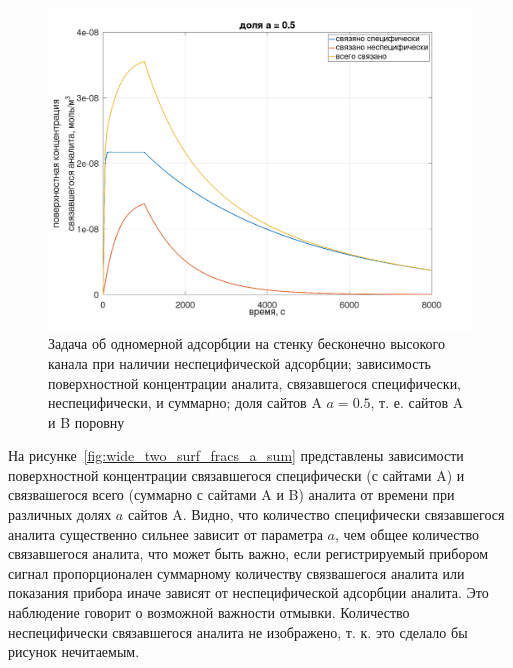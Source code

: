 \documentclass[oneside,final,12pt]{extreport}
\begin{document}
\begin{figure}
  \centering
  \includegraphics[width=.7\textwidth]{pic/flat_wide_twosurf_example}

  \caption{%
    \label{fig:flat_wide_two_surf_example}%
    Задача об одномерной адсорбции на стенку бесконечно высокого канала
    при наличии неспецифической адсорбции;
    зависимость поверхностной концентрации аналита,
    связавшегося специфически, неспецифически, и суммарно;
    доля сайтов A $a = 0.5$, т. е. сайтов A и B поровну
  }

\end{figure}

На рисунке~\ref{fig:wide_two_surf_fracs_a_sum} представлены зависимости
поверхностной концентрации связавшегося специфически (с сайтами A) и
связвашегося всего (суммарно с сайтами A и B)
аналита от времени при различных долях $a$ сайтов A.
Видно, что количество специфически связавшегося аналита существенно сильнее
зависит от параметра $a$, чем общее количество связавшегося аналита,
что может быть важно, если регистрируемый прибором сигнал пропорционален
суммарному количеству связвашегося аналита или
показания прибора иначе зависят от неспецифической адсорбции аналита.
Это наблюдение говорит о возможной важности отмывки.
Количество неспецифически связавшегося аналита не изображено,
т. к. это сделало бы рисунок нечитаемым.
\end{document}
